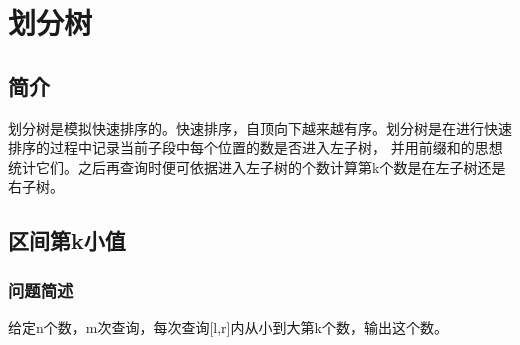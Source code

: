 \section{划分树}

\subsection{简介}
    划分树是模拟快速排序的。快速排序，自顶向下越来越有序。划分树是在进行快速排序的过程中记录当前子段中每个位置的数是否进入左子树，
    并用前缀和的思想统计它们。之后再查询时便可依据进入左子树的个数计算第k个数是在左子树还是右子树。

\subsection{区间第k小值}
    \subsubsection{问题简述}
        给定n个数，m次查询，每次查询[l,r]内从小到大第k个数，输出这个数。
